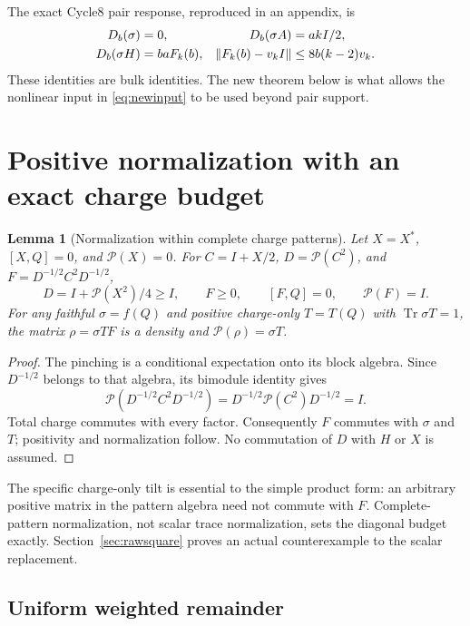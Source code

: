 \documentclass[11pt]{article}
\newtheorem{lemma}[theorem]{Lemma}
\newcommand{\Tr}{\operatorname{Tr}}
\newcommand{\norm}[1]{\lVert #1\rVert}
\newcommand{\pin}{\mathcal P}
\begin{document}
The exact Cycle8 pair response, reproduced in an appendix, is
\begin{align}
 D_b(\sigma)&=0,& D_b(\sigma A)&=akI/2,\notag\\
 D_b(\sigma H)&=baF_k(b),&
 \norm{F_k(b)-v_kI}&\le8b(k-2)v_k.\label{eq:pairresponse}
\end{align}
These identities are bulk identities. The new theorem below is what
allows the nonlinear input in \eqref{eq:newinput} to be used beyond
pair support.



\section{Positive normalization with an exact charge budget}

\begin{lemma}[Normalization within complete charge patterns]\label{lem:gram}
Let \(X=X^*\), \([X,Q]=0\), and \(\pin(X)=0\). For \(C=I+X/2\),
\(D=\pin(C^2)\), and \(F=D^{-1/2}C^2D^{-1/2}\),
\[
 D=I+\pin(X^2)/4\ge I,\qquad F\ge0,\qquad [F,Q]=0,
 \qquad\pin(F)=I.
\]
For any faithful \(\sigma=f(Q)\) and positive charge-only \(T=T(Q)\)
with \(\Tr\sigma T=1\), the matrix \(\rho=\sigma TF\) is a density
and \(\pin(\rho)=\sigma T\).
\end{lemma}
\begin{proof}
The pinching is a conditional expectation onto its block algebra.
Since \(D^{-1/2}\) belongs to that algebra, its bimodule identity gives
\[
 \pin(D^{-1/2}C^2D^{-1/2})
 =D^{-1/2}\pin(C^2)D^{-1/2}=I.
\]
Total charge commutes with every factor. Consequently \(F\) commutes
with \(\sigma\) and \(T\); positivity and normalization follow.
No commutation of \(D\) with \(H\) or \(X\) is assumed.
\end{proof}

The specific charge-only tilt is essential to the simple product form:
an arbitrary positive matrix in the pattern algebra need not commute with
\(F\). Complete-pattern normalization, not scalar trace normalization,
sets the diagonal budget exactly. Section~\ref{sec:rawsquare} proves an
actual counterexample to the scalar replacement.

\subsection{Uniform weighted remainder}
\end{document}
